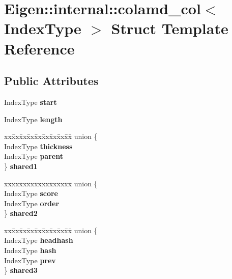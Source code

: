 \hypertarget{struct_eigen_1_1internal_1_1colamd__col}{}\section{Eigen\+:\+:internal\+:\+:colamd\+\_\+col$<$ Index\+Type $>$ Struct Template Reference}
\label{struct_eigen_1_1internal_1_1colamd__col}
\subsection*{Public Attributes}
\begin{DoxyCompactItemize}
\item 
\mbox{\label{struct_eigen_1_1internal_1_1colamd__col_a687db8c17f3026acfb354d52def9326c}} 
Index\+Type {\bfseries start}
\item 
\mbox{\label{struct_eigen_1_1internal_1_1colamd__col_a7654b4d10c3ea9cae1522b31bd138eb1}} 
Index\+Type {\bfseries length}
\item 
\mbox{\label{struct_eigen_1_1internal_1_1colamd__col_a191274b94b401036f10bb4dd35188dac}} 
\begin{tabbing}
xx\=xx\=xx\=xx\=xx\=xx\=xx\=xx\=xx\=\kill
union \{\\
\>IndexType {\bfseries thickness}\\
\>IndexType {\bfseries parent}\\
\} {\bfseries shared1}\\

\end{tabbing}\item 
\mbox{\label{struct_eigen_1_1internal_1_1colamd__col_a43b921c8a1715e538d9350f371593df3}} 
\begin{tabbing}
xx\=xx\=xx\=xx\=xx\=xx\=xx\=xx\=xx\=\kill
union \{\\
\>IndexType {\bfseries score}\\
\>IndexType {\bfseries order}\\
\} {\bfseries shared2}\\

\end{tabbing}\item 
\mbox{\label{struct_eigen_1_1internal_1_1colamd__col_a4f92e60ee78e74e4733308eae670c3f2}} 
\begin{tabbing}
xx\=xx\=xx\=xx\=xx\=xx\=xx\=xx\=xx\=\kill
union \{\\
\>IndexType {\bfseries headhash}\\
\>IndexType {\bfseries hash}\\
\>IndexType {\bfseries prev}\\
\} {\bfseries shared3}\\


\end{tabbing}
\end{DoxyCompactItemize}
